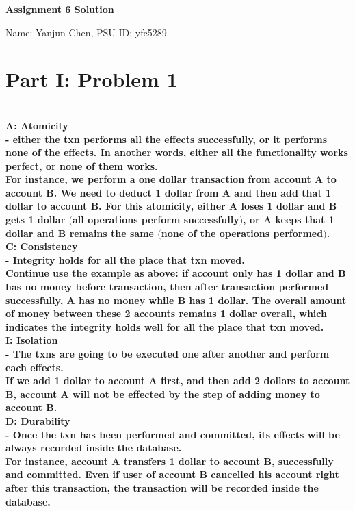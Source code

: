 \documentclass[letterpaper,11pt]{article}
\newcommand{\Paragraph}[1]{~\vspace*{-0.7\baselineskip}\\{\bf #1}}
\begin{document}
\begin{center}
	{\LARGE \bf Assignment 6 Solution}
	
	{\large
	Name: Yanjun Chen, PSU ID: yfc5289}
\end{center}

\section*{Part I: Problem 1}
\Paragraph{
	A: Atomicity\\
	- either the txn performs all the effects successfully, or it performs none of the effects. In another words, either 
	all the functionality works perfect, or none of them works. \\
	For instance, we perform a one dollar transaction from account A to account B. We need to deduct 1 dollar from A and then add that 1 dollar 
	to account B. For this atomicity, either A loses 1 dollar and B gets 1 dollar \((\)all operations perform successfully\()\), or A keeps that 1 dollar 
	and B remains the same \((\)none of the operations performed\()\).\\
	C: Consistency\\
	- Integrity holds for all the place that txn moved. \\
	Continue use the example as above: if account only has 1 dollar and B has no money before transaction, then after transaction performed successfully, A 
	has no money while B has 1 dollar. The overall amount of money between these 2 accounts remains 1 dollar overall, which indicates the integrity holds well 
	for all the place that txn moved. \\
	I: Isolation\\
	- The txns are going to be executed one after another and perform each effects. \\
	If we add 1 dollar to account A first, and then add 2 dollars to account B, account A will not be effected by the step of adding money to account B. \\
	D: Durability\\
	- Once the txn has been performed and committed, its effects will be always recorded inside the database. \\
	For instance, account A transfers 1 dollar to account B, successfully and committed. Even if user of account B cancelled his account right after this transaction, 
	the transaction will be recorded inside the database. 
}
\end{document}
